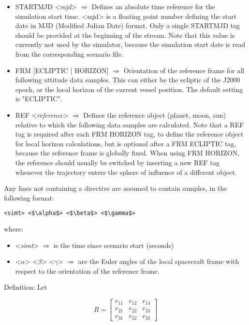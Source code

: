 \documentclass[Orbiter Technical Reference.tex]{subfiles}
\begin{document}
\begin{itemize}
\item STARTMJD <\textit{mjd}> $\Rightarrow$ Defines an absolute time reference for the simulation start time. <mjd> is a floating point number defining the start date in MJD (Modified Julian Date) format. Only a single STARTMJD tag should be provided at the beginning of the stream. Note that this value is currently not used by the simulator, because the simulation start date is read from the corresponding scenario file.
\item FRM [ECLIPTIC | HORIZON] $\Rightarrow$ Orientation of the reference frame for all following attitude data samples. This can either be the ecliptic of the J2000 epoch, or the local horizon of the current vessel position. The default setting is "ECLIPTIC".
\item REF <\textit{reference}> $\Rightarrow$ Defines the reference object (planet, moon, sun) relative to which the following data samples are calculated. Note that a REF tag is required after each FRM HORIZON tag, to define the reference object for local horizon calculations, but is optional after a FRM ECLIPTIC tag, because the reference frame is globally fixed.
When using FRM HORIZON, the reference should usually be switched by inserting a new REF tag whenever the trajectory enters the sphere of influence of a different object.
\end{itemize}

\noindent
Any lines not containing a directive are assumed to contain samples, in the following format:

\begin{lstlisting}[language=OSFS,mathescape=true]
<simt> <$\alpha$> <$\beta$> <$\gamma$>
\end{lstlisting}

\noindent
where:

\begin{itemize}
\item <\textit{simt}> $\Rightarrow$ is the time since scenario start (seconds)
\item <$\alpha$> <$\beta$> <$\gamma$> $\Rightarrow$ are the Euler angles of the local spacecraft frame with respect to the orientation of the reference frame.
\end{itemize}

\noindent
Definition: Let

\[ R = 
\begin{bmatrix}
r_{11} & r_{12} & r_{13}\\
r_{21} & r_{22} & r_{23}\\
r_{31} & r_{32} & r_{33}
\end{bmatrix}
\]
\end{document}
